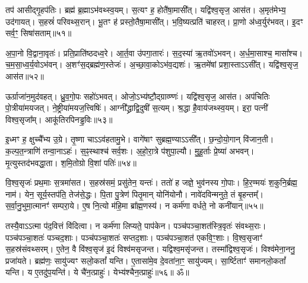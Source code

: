    तप॑ आसीद्गृ॒हप॑तिः।
   ब्रह्म॑ ब्र॒ह्माऽभ॑वथ्स्व॒यम्।
   स॒त्यꣳ ह॒ होतै॑षा॒मासी᳚त्।
   यद्वि॑श्व॒सृज॒ आस॑त।
   अ॒मृत॑मेभ्य॒ उद॑गायत्।
   स॒हस्रं॑ परिवथ्स॒रान्।
   भू॒तꣳ ह॑ प्रस्तो॒तैषा॒मासी᳚त्।
   भ॒वि॒ष्यत्प्रति॑ चाहरत्।
   प्रा॒णो अ॑ध्व॒र्युर॑भवत्।
   इ॒दꣳ सर्व॒ꣳ॒ सिषा॑सताम्॥५१॥

   अ॒पा॒नो वि॒द्वाना॒वृतः॑।
   प्रति॒प्राति॑ष्ठदध्व॒रे।
   आ॒र्त॒वा उ॑पगा॒तारः॑।
   स॒द॒स्या॑ ऋ॒तवो॑ऽभवन्।
   अ॒र्ध॒मा॒साश्च॒ मासा᳚श्च।
   च॒म॒सा॒ध्व॒र्य॒वोऽभ॑वन्।
   अ॒शꣳ॑स॒द्ब्रह्म॑ण॒स्तेजः॑।
   अ॒च्छा॒वा॒कोऽभ॑व॒द्यशः॑।
   ऋ॒तमे॑षां प्रशा॒स्ताऽऽसी᳚त्।
   यद्वि॑श्व॒सृज॒ आस॑त॥५२॥

   ऊर्ग्राजा॑न॒मुद॑वहत्।
   ध्रु॒व॒गो॒पः सहो॑ऽभवत्।
   ओजो॒ऽभ्य॑ष्टौ॒\-द्ग्राव्ण्णः॑।
   यद्वि॑श्व॒सृज॒ आस॑त।
   अप॑चितिः पो॒त्रीया॑मयजत्।
   ने॒ष्ट्रीया॑म\-यज॒त्त्विषिः॑।
   आग्नी᳚द्ध्राद्वि॒दुषी॑ स॒त्यम्।
   श्र॒द्धा है॒वाय॑जथ्स्व॒यम्।
   इरा॒ पत्नी॑ विश्व॒सृजा᳚म्।
   आकू॑तिरपिन\-ड्ढ॒विः॥५३॥

   इ॒ध्मꣳ ह॒ क्षुच्चै᳚भ्य उ॒ग्रे।
   तृ॒ष्णा चाऽऽव॑हतामु॒भे।
   वागे॑षाꣳ सुब्रह्म॒ण्याऽऽसी᳚त्।
   छ॒न्दो॒यो॒गान् वि॑जान॒ती।
   क॒ल्प॒त॒न्त्राणि॑ तन्वा॒नाऽहः॑।
   स॒ꣴ॒स्थाश्च॑ सर्व॒शः।
   अ॒हो॒रा॒त्रे प॑शुपा॒ल्यौ।
   मु॒हू॒र्ताः प्रे॒ष्या॑ अभवन्।
   मृ॒त्युस्तद॑भवद्धा॒ता।
   श॒मि॒तोग्रो वि॒शां पतिः॑॥५४॥

   वि॒श्व॒सृजः॑ प्रथ॒माः स॒त्रमा॑सत।
   स॒हस्र॑समं॒ प्रसु॑तेन॒ यन्तः॑।
   ततो॑ ह जज्ञे॒ भुव॑नस्य गो॒पाः।
   हि॒र॒ण्मयः॑ श॒कुनि॒र्ब्रह्म॒ नाम॑।
   येन॒ सूर्य॒स्तप॑ति॒ तेज॑से॒द्धः।
   पि॒ता पु॒त्रेण॑ पितृ॒मान् योनि॑योनौ।
   नावे॑दविन्मनुते॒ तं बृ॒हन्तम्᳚।
   स॒र्वा॒नु॒भुमा॒त्मानꣳ॑ सम्परा॒ये।
   ए॒ष नि॒त्यो म॑हि॒मा ब्रा᳚ह्म॒णस्य॑।
   न कर्म॑णा वर्धते॒ नो कनी॑यान्॥५५॥

   तस्यै॒वाऽऽत्मा प॑द॒वित्तं वि॑दित्वा।
   न कर्म॑णा लिप्यते॒ पाप॑केन।
   पञ्च॑पञ्चा॒शत॑स्त्रि॒वृतः॑ संवथ्स॒राः।
   पञ्च॑पञ्चा॒शतः॑ पञ्चद॒शाः।
   पञ्च॑पञ्चा॒शतः॑ सप्तद॒शाः।
   पञ्च॑पञ्चा॒शत॑ एकवि॒ꣳ॒शाः।
   वि॒श्व॒सृजाꣳ॑ स॒हस्र॑संवथ्सरम्।
   ए॒तेन॒ वै वि॑श्व॒सृज॑ इ॒दं विश्व॑मसृजन्त।
   यद्विश्व॒मसृ॑जन्त।
   तस्मा᳚द्विश्व॒सृजः॑।
   विश्व॑मेना॒ननु॒ प्रजा॑यते।
   ब्रह्म॑णः॒ सायु॑ज्यꣳ सलो॒कतां᳚ यन्ति।
   ए॒तासा॑मे॒व दे॒वता॑ना॒ꣳ॒ सायु॑ज्यम्।
   सा॒र्ष्टिताꣳ॑ समानलो॒कतां᳚ यन्ति।
   य ए॒तदु॑प॒यन्ति॑।
   ये चै॑न॒त्प्राहुः॑।
   येभ्य॑श्चैन॒त्प्राहुः॑॥५६॥
 ॐ॥


\closesection